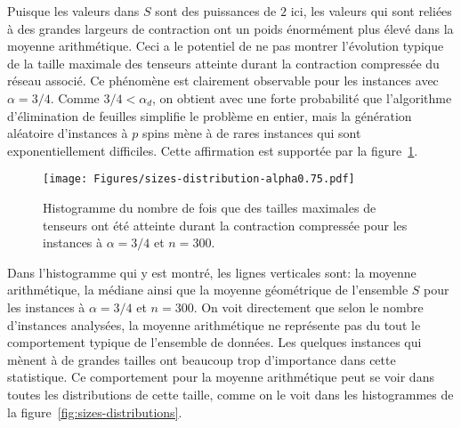 Puisque les valeurs dans $S$ sont des puissances de $2$ ici, les valeurs qui sont reliées à des grandes largeurs de contraction ont un poids énormément plus élevé dans la moyenne arithmétique.
Ceci a le potentiel de ne pas montrer l'évolution typique de la taille maximale des tenseurs atteinte durant la contraction compressée du réseau associé.
Ce phénomène est clairement observable pour les instances avec $\alpha = 3/4$.
Comme $3/4 < \alpha_d$, on obtient avec une forte probabilité que l'algorithme d'élimination de feuilles simplifie le problème en entier, mais la génération aléatoire d'instances à $p$ spins mène à de rares instances qui sont exponentiellement difficiles.
Cette affirmation est supportée par la figure~\ref{fig:sizes-distribution}.
\begin{figure}[h]
    \centering
    \texttt{[image: Figures/sizes-distribution-alpha0.75.pdf]}
    \caption[Histogramme du nombre de fois que des tailles maximales de tenseurs ont été atteinte à $\alpha = 3/4$ et à $n = 300$.]{Histogramme du nombre de fois que des tailles maximales de tenseurs ont été atteinte durant la contraction compressée pour les instances à $\alpha = 3/4$ et $n = 300$.}
    \label{fig:sizes-distribution}
\end{figure}
Dans l'histogramme qui y est montré, les lignes verticales sont: la moyenne arithmétique, la médiane ainsi que la moyenne géométrique de l'ensemble $S$ pour les instances à $\alpha = 3/4$ et $n = 300$.
On voit directement que selon le nombre d'instances analysées, la moyenne arithmétique ne représente pas du tout le comportement typique de l'ensemble de données.
Les quelques instances qui mènent à de grandes tailles ont beaucoup trop d'importance dans cette statistique.
Ce comportement pour la moyenne arithmétique peut se voir dans toutes les distributions de cette taille, comme on le voit dans les histogrammes de la figure~\ref{fig:sizes-distributions}.
